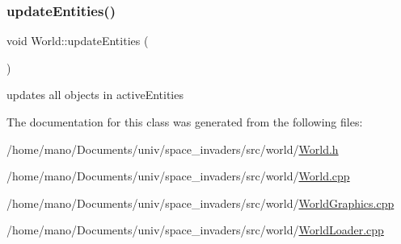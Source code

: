 \subsubsection{\texorpdfstring{update\+Entities()}{updateEntities()}}
{\footnotesize\ttfamily void World\+::update\+Entities (\begin{DoxyParamCaption}{ }\end{DoxyParamCaption})}

updates all objects in active\+Entities 

The documentation for this class was generated from the following files\+:\begin{DoxyCompactItemize}
\item 
/home/mano/\+Documents/univ/space\+\_\+invaders/src/world/\hyperlink{World_8h}{World.\+h}\item 
/home/mano/\+Documents/univ/space\+\_\+invaders/src/world/\hyperlink{World_8cpp}{World.\+cpp}\item 
/home/mano/\+Documents/univ/space\+\_\+invaders/src/world/\hyperlink{WorldGraphics_8cpp}{World\+Graphics.\+cpp}\item 
/home/mano/\+Documents/univ/space\+\_\+invaders/src/world/\hyperlink{WorldLoader_8cpp}{World\+Loader.\+cpp}\end{DoxyCompactItemize}

